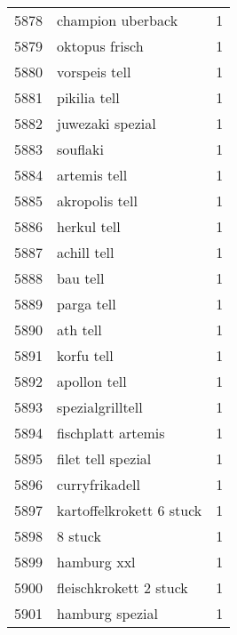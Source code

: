 \begin{tabular}{llr}
5878 &                                  champion uberback &      1 \\
5879 &                                     oktopus frisch &      1 \\
5880 &                                      vorspeis tell &      1 \\
5881 &                                       pikilia tell &      1 \\
5882 &                                   juwezaki spezial &      1 \\
5883 &                                           souflaki &      1 \\
5884 &                                       artemis tell &      1 \\
5885 &                                     akropolis tell &      1 \\
5886 &                                        herkul tell &      1 \\
5887 &                                        achill tell &      1 \\
5888 &                                           bau tell &      1 \\
5889 &                                         parga tell &      1 \\
5890 &                                           ath tell &      1 \\
5891 &                                         korfu tell &      1 \\
5892 &                                       apollon tell &      1 \\
5893 &                                   spezialgrilltell &      1 \\
5894 &                                 fischplatt artemis &      1 \\
5895 &                                 filet tell spezial &      1 \\
5896 &                                     curryfrikadell &      1 \\
5897 &                           kartoffelkrokett 6 stuck &      1 \\
5898 &                                            8 stuck &      1 \\
5899 &                                        hamburg xxl &      1 \\
5900 &                             fleischkrokett 2 stuck &      1 \\
5901 &                                    hamburg spezial &      1 \\

\end{tabular}
